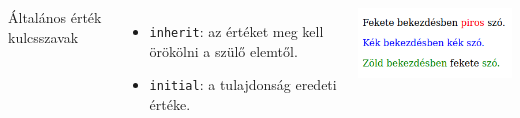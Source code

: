 \begin{frame}
  \begin{columns}[c]
      Általános érték kulcsszavak
      \begin{itemize}
        \item \texttt{inherit}: az értéket meg kell örökölni a szülő elemtől.
        \item \texttt{initial}: a tulajdonság eredeti értéke.
      \end{itemize}      
      \includegraphics[width=\textwidth]{inherit.png}
  \end{columns}
  \begin{exampleblock}{}
    \scriptsize
    
    
  \end{exampleblock}
\end{frame}
